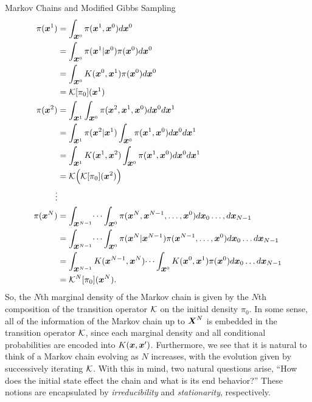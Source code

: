 \begin{chapter}{Markov Chains and Modified Gibbs Sampling}
\begin{align} 
  \pi(\mbox{\boldmath$x$}^1) 
    &= \int_{\mbox{\boldmath$x$}^0} \pi(\mbox{\boldmath$x$}^1,\mbox{\boldmath$x$}^0) d\mbox{\boldmath$x$}^0 \nonumber\\
    &= \int_{\mbox{\boldmath$x$}^0} \pi(\mbox{\boldmath$x$}^1|\mbox{\boldmath$x$}^0)\pi( \mbox{\boldmath$x$}^0) d\mbox{\boldmath$x$}^0 \nonumber\\
    &= \int_{\mbox{\boldmath$x$}^0} K(\mbox{\boldmath$x$}^0,\mbox{\boldmath$x$}^1)\pi( \mbox{\boldmath$x$}^0) d\mbox{\boldmath$x$}^0\nonumber\\
    &= \mathcal K [\pi_0](\mbox{\boldmath$x$}^1) \\
  \pi(\mbox{\boldmath$x$}^2) 
    &= \int_{\mbox{\boldmath$x$}^1}\int_{\mbox{\boldmath$x$}^0} \pi(\mbox{\boldmath$x$}^2,\mbox{\boldmath$x$}^1,\mbox{\boldmath$x$}^0) d\mbox{\boldmath$x$}^0 d\mbox{\boldmath$x$}^1\nonumber\\
    &= \int_{\mbox{\boldmath$x$}^1}\pi(\mbox{\boldmath$x$}^2|\mbox{\boldmath$x$}^1)\int_{\mbox{\boldmath$x$}^0} \pi(\mbox{\boldmath$x$}^1,\mbox{\boldmath$x$}^0) d\mbox{\boldmath$x$}^0 d\mbox{\boldmath$x$}^1\nonumber\\
    &= \int_{\mbox{\boldmath$x$}^1}K(\mbox{\boldmath$x$}^1,\mbox{\boldmath$x$}^2)\int_{\mbox{\boldmath$x$}^0} \pi(\mbox{\boldmath$x$}^1,\mbox{\boldmath$x$}^0) d\mbox{\boldmath$x$}^0 d\mbox{\boldmath$x$}^1\nonumber\\
    &= \mathcal K \Big( \mathcal K [\pi_0](\mbox{\boldmath$x$}^2)\Big)\\
    \vdots\nonumber\\
  \pi(\mbox{\boldmath$x$}^N)  
    &= \int_{\mbox{\boldmath$x$}^{N-1}}\dots\int_{\mbox{\boldmath$x$}^0} \pi(\mbox{\boldmath$x$}^N, \mbox{\boldmath$x$}^{N-1},\dots,\mbox{\boldmath$x$}^0)d\mbox{\boldmath$x$}_0\dots,d\mbox{\boldmath$x$}_{N-1}\nonumber\\
    &= \int_{\mbox{\boldmath$x$}^{N-1}}\dots\int_{\mbox{\boldmath$x$}^0} \pi(\mbox{\boldmath$x$}^N| \mbox{\boldmath$x$}^{N-1})\pi(\mbox{\boldmath$x$}^{N-1},\dots,\mbox{\boldmath$x$}^0)d\mbox{\boldmath$x$}_0\dots d\mbox{\boldmath$x$}_{N-1} \nonumber\\
    &= \int_{\mbox{\boldmath$x$}^{N-1}}K( \mbox{\boldmath$x$}^{N-1},\mbox{\boldmath$x$}^N)\dots\int_{\mbox{\boldmath$x$}^0} K(\mbox{\boldmath$x$}^0,\mbox{\boldmath$x$}^1)\pi(\mbox{\boldmath$x$}^0)d\mbox{\boldmath$x$}_0\dots d\mbox{\boldmath$x$}_{N-1} \nonumber\\
    &= \mathcal K^N [\pi_0](\mbox{\boldmath$x$}^N).
\end{align}
So, the $N$th marginal density of the Markov chain is given by the $N$th composition of the transition operator $\mathcal K$ on the initial density $\pi_0$.
In some sense, all of the information of the Markov chain up to $\mbox{\boldmath$X$}^N$ is embedded in the transition operator $\mathcal K$, since each marginal density and all conditional probabilities are encoded into $K(\mbox{\boldmath$x$}, \mbox{\boldmath$x$}')$.
Furthermore, we see that it is natural to think of a Markov chain evolving as $N$ increases, with the evolution given by successively iterating $\mathcal K$.
With this in mind, two natural questions arise, ``How does the initial state effect the chain and what is its end behavior?'' 
These notions are encapsulated by \emph{irreducibility} and \emph{stationarity}, respectively.



\end{chapter}
